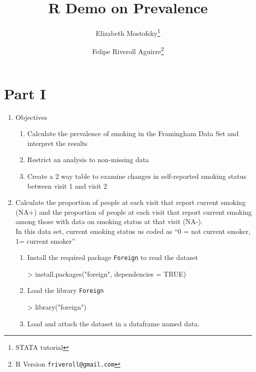 \documentclass{article}
\begin{document}
\title{R Demo on Prevalence}
\author{Elizabeth Mostofsky\footnote{STATA tutorial}
    \and Felipe Riveroll Aguirre\thanks{R Version \texttt{friveroll@gmail.com}}} 
\maketitle



\section{Part I}


\begin{enumerate}
\item Objectives
\begin{enumerate}
\item Calculate the prevalence of smoking in the Framingham Data Set and interpret the results
\item Restrict an analysis to non-missing data
\item Create a 2 way table to examine changes in self-reported smoking status between visit 1 and visit 2
\end{enumerate}
\item Calculate the proportion of people at each visit that report current smoking (NA+) and the proportion of people at each visit that report current smoking among 
those with data on smoking status at that visit (NA-).   
\\In this data set, current smoking status us coded as ``0 = not current smoker, 1= current smoker''
\begin{enumerate}
\item Install the required package \texttt{Foreign} to read the dataset
\begin{Schunk}
\begin{Sinput}
> install.packages("foreign", dependencies = TRUE)
\end{Sinput}
\end{Schunk}
\item Load the library \texttt{Foreign}
\begin{Schunk}
\begin{Sinput}
> library("foreign")
\end{Sinput}
\end{Schunk}
\item Load and attach the dataset in a dataframe named data.
\begin{Schunk}
\begin{Sinput}

\end{Sinput}
\end{Schunk}
\end{enumerate}
\end{enumerate}
\end{document}
